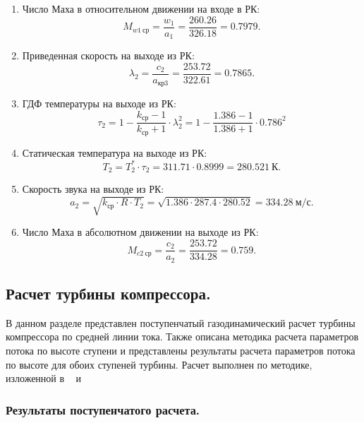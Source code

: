 \documentclass[a4paper,12pt]{article}
\begin{document}
\begin{enumerate}
        \item Число Маха в относительном движении на входе в РК:
        \[
            M_{w1\ ср} = \frac{ w_1 }{ a_1 } = \frac{ 260.26 }{ 326.18 } = 
            0.7979.
        \]

        \item Приведенная скорость на выходе из РК:
        \[
            \lambda_2 = \frac{ c_2 }{ a_{кр3} } =
            \frac{ 253.72 }{ 322.61 } = 
            0.7865.
        \]

        \item ГДФ температуры на выходе из РК:
        \[
            \tau_2 = 1 - \frac{ k_{ср} - 1 }{ k_{ср} + 1 } \cdot \lambda_2^2 =  
            1 - \frac{ 1.386 - 1 }{ 1.386 + 1 } \cdot 0.786^2
        \]

        \item Статическая температура на выходе из РК:
        \[
            T_2 = T_2^* \cdot \tau_2 = 311.71 \cdot 0.8999 =
            280.521\ К.
        \]

        \item Скорость звука на выходе из РК:
        \[
            a_2 = \sqrt{ k_{ср} \cdot R \cdot T_2 } = 
            \sqrt{ 1.386 \cdot 287.4 \cdot 280.52 } =
            334.28\ м/с.
        \]

         \item Число Маха в абсолютном движении на выходе из РК:
        \[
            M_{c2\ ср} = \frac{ c_2 }{ a_2 } = \frac{ 253.72 }{ 334.28 } = 
            0.759.
        \]

    \end{enumerate}

    

    \subsection{Расчет турбины компрессора.}
    В данном разделе представлен поступенчатый газодинамический расчет турбины компрессора по средней линии тока.
    Также описана методика расчета параметров потока по высоте ступени и представлены результаты расчета параметров
    потока по высоте для обоих ступеней турбины.
    Расчет выполнен по методике, изложенной в ~\cite{molyakov1} и ~\cite{molyakov2}
    \subsubsection{Результаты поступенчатого расчета.}
%    
\end{document}
